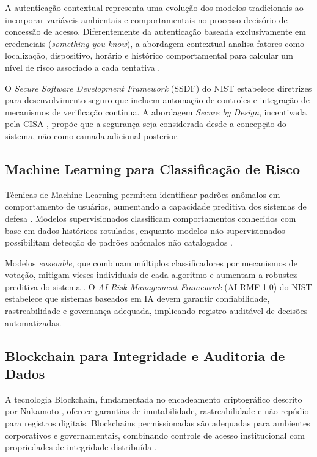 \documentclass[12pt]{article}
\begin{document}
A autenticação contextual representa uma evolução dos modelos tradicionais ao incorporar variáveis ambientais e comportamentais no processo decisório de concessão de acesso. Diferentemente da autenticação baseada exclusivamente em credenciais (\textit{something you know}), a abordagem contextual analisa fatores como localização, dispositivo, horário e histórico comportamental para calcular um nível de risco associado a cada tentativa \cite{nist2020}.

O \textit{Secure Software Development Framework} (SSDF) do NIST \cite{nist2022} estabelece diretrizes para desenvolvimento seguro que incluem automação de controles e integração de mecanismos de verificação contínua. A abordagem \textit{Secure by Design}, incentivada pela CISA \cite{cisa2023}, propõe que a segurança seja considerada desde a concepção do sistema, não como camada adicional posterior.

\subsection{Machine Learning para Classificação de Risco}

Técnicas de Machine Learning permitem identificar padrões anômalos em comportamento de usuários, aumentando a capacidade preditiva dos sistemas de defesa \cite{nist2023ai}. Modelos supervisionados classificam comportamentos conhecidos com base em dados históricos rotulados, enquanto modelos não supervisionados possibilitam detecção de padrões anômalos não catalogados \cite{goodfellow2016}.

Modelos \textit{ensemble}, que combinam múltiplos classificadores por mecanismos de votação, mitigam vieses individuais de cada algoritmo e aumentam a robustez preditiva do sistema \cite{scikit2024}. O \textit{AI Risk Management Framework} (AI RMF 1.0) do NIST \cite{nist2023ai} estabelece que sistemas baseados em IA devem garantir confiabilidade, rastreabilidade e governança adequada, implicando registro auditável de decisões automatizadas.

\subsection{Blockchain para Integridade e Auditoria de Dados}

A tecnologia Blockchain, fundamentada no encadeamento criptográfico descrito por Nakamoto \cite{nakamoto2008}, oferece garantias de imutabilidade, rastreabilidade e não repúdio para registros digitais. Blockchains permissionadas são adequadas para ambientes corporativos e governamentais, combinando controle de acesso institucional com propriedades de integridade distribuída \cite{nist2018blockchain}.
\end{document}
